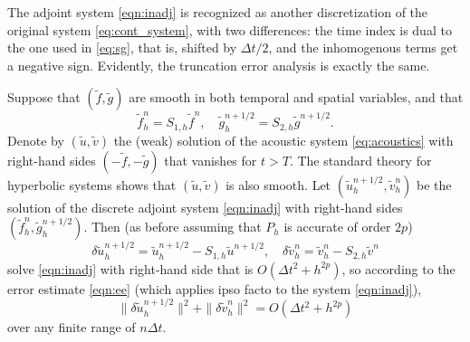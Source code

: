 The adjoint system
\ref{eqn:inadj} is recognized as another discretization of the
original system \ref{eq:cont_system}, with two differences: 
the time index is dual to the one used in \ref{eq:sg}, that is, 
shifted by $\Delta t/2$, and the inhomogenous terms get a negative sign. Evidently, the truncation error analysis is exactly the same. 

Suppose that $(\tilde f,\tilde g)$ are smooth in both temporal and spatial variables, and that 
\begin{equation}\label{eq:tilde_f}
	\tilde f_h^n = S_{1,h}\tilde f^{n}, \quad
	\tilde g_h^{n+1/2} = S_{2,h} \tilde g^{n+1/2}.
\end{equation}
Denote by $(\tilde u,\tilde v)$ the (weak) solution of the acoustic system \ref{eq:acoustics} with
right-hand sides $(-\tilde f,-\tilde g)$ that vanishes for $t>T$. 
The standard theory for hyperbolic systems shows that $(\tilde u,\tilde v)$ is also smooth. 
Let $(\tilde u_h^{n+1/2},\tilde v_h^n)$ be the solution of the discrete adjoint system
\ref{eqn:inadj} with right-hand sides $(\tilde f_h^n, \tilde g_h^{n+1/2})$. 
Then (as before assuming that $P_h$ is accurate of order $2p$)
\[
	\delta \tilde u_h^{n+1/2} = \tilde u_h^{n+1/2} - S_{1,h} \tilde u^{n+1/2},\quad
	\delta \tilde v_h^{n} = \tilde v_h^{n} - S_{2,h} \tilde v^{n}
\]
solve \ref{eqn:inadj} with right-hand side that is
$O(\Delta t^2+h^{2p})$, so according to the error estimate \ref{eqn:ee}
(which applies ipso facto to the system \ref{eqn:inadj}),
\begin{equation}
\label{eqn:truncadj}
	\| \delta \tilde u_h^{n+1/2}\|^2 + \|\delta \tilde v_h^{n}\|^2 = O(\Delta t^2+h^{2p})
\end{equation}
over any finite range of $n\Delta t$. 

